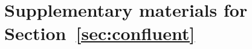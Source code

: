 \documentclass{msc}
\theoremstyle{definition}
\begin{document}

















\appendix


%


%


%

\section{Supplementary materials for Section~\ref{sec:confluent}}




%




\end{document}

